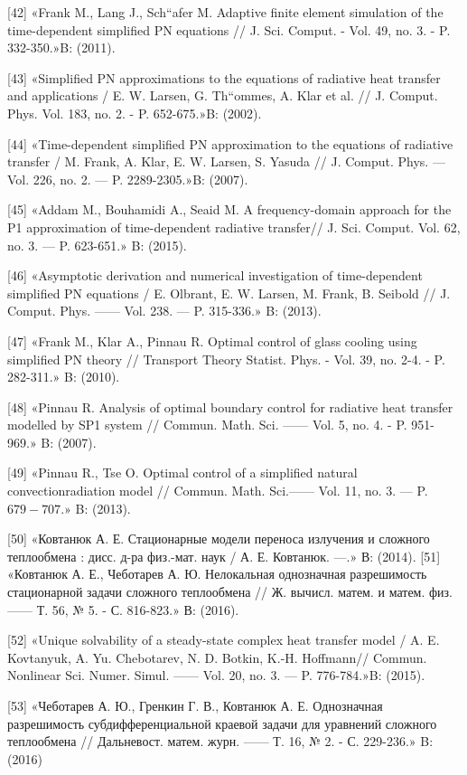 \documentclass[10pt]{article}
\begin{document}
[42] «Frank M., Lang J., Sch“afer M. Adaptive finite element simulation of the time-dependent simplified PN equations // J. Sci. Comput. - Vol. 49, no. 3. - P. 332-350.»B: (2011).

[43] «Simplified PN approximations to the equations of radiative heat transfer and applications / E. W. Larsen, G. Th“ommes, A. Klar et al. // J. Comput. Phys. Vol. 183, no. 2. - P. 652-675.»B: (2002).

[44] «Time-dependent simplified $\mathrm{PN}$ approximation to the equations of radiative transfer / M. Frank, A. Klar, E. W. Larsen, S. Yasuda // J. Comput. Phys. — Vol. 226, no. 2. — P. 2289-2305.»B: (2007).

[45] «Addam M., Bouhamidi A., Seaid M. A frequency-domain approach for the P1 approximation of time-dependent radiative transfer// J. Sci. Comput. Vol. 62, no. 3. — P. 623-651.» B: (2015).

[46] «Asymptotic derivation and numerical investigation of time-dependent simplified PN equations / E. Olbrant, E. W. Larsen, M. Frank, B. Seibold // J. Comput. Phys. —— Vol. 238. — P. 315-336.» B: (2013).

[47] «Frank M., Klar A., Pinnau R. Optimal control of glass cooling using simplified PN theory // Transport Theory Statist. Phys. - Vol. 39, no. 2-4. - P. 282-311.» B: (2010).

[48] «Pinnau R. Analysis of optimal boundary control for radiative heat transfer modelled by SP1 system // Commun. Math. Sci. —— Vol. 5, no. 4. - P. 951-969.» B: (2007).

[49] «Pinnau R., Tse O. Optimal control of a simplified natural convectionradiation model // Commun. Math. Sci.—— Vol. 11, no. 3. — P. $679-707 . »$ B: (2013).

[50] «Ковтанюк А. Е. Стационарные модели переноса излучения и сложного теплообмена : дисс. д-ра физ.-мат. наук / А. Е. Ковтанюк. —.» В: (2014). [51] «Ковтанюк А. Е., Чеботарев А. Ю. Нелокальная однозначная разрешимость стационарной задачи сложного теплообмена // Ж. вычисл. матем. и матем. физ. —— Т. 56, № 5. - С. 816-823.» В: (2016).

[52] «Unique solvability of a steady-state complex heat transfer model / A. E. Kovtanyuk, A. Yu. Chebotarev, N. D. Botkin, K.-H. Hoffmann// Commun. Nonlinear Sci. Numer. Simul. —— Vol. 20, no. 3. — P. 776-784.»B: (2015).

[53] «Чеботарев А. Ю., Гренкин Г. В., Ковтанюк А. Е. Однозначная разрешимость субдифференциальной краевой задачи для уравнений сложного теплообмена // Дальневост. матем. журн. —— Т. 16, № 2. - С. 229-236.» B: (2016)
\end{document}
